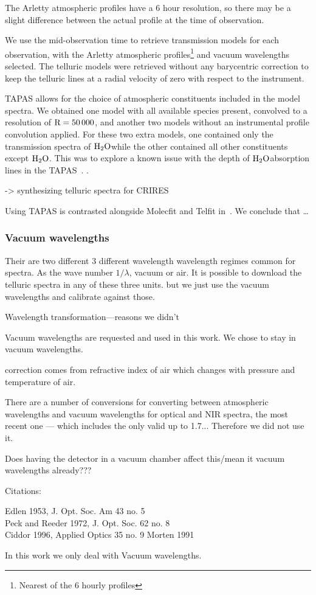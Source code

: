 The Arletty atmospheric profiles have a 6 hour resolution, so there may be a slight difference between the actual profile at the time of observation.

We use the mid-observation time to retrieve transmission models for each observation, with the Arletty atmospheric profiles\footnote{Nearest of the 6 hourly profiles} and vacuum wavelengths selected. The telluric models were retrieved without any barycentric correction to keep the telluric lines at a radial velocity of zero with respect to the instrument.

TAPAS allows for the choice of atmospheric constituents included in the model spectra. We obtained one model with all available species present, convolved to a resolution of \(\rm R=50\,000\), and another two models without an instrumental profile convolution applied. For these two extra models, one contained only the transmission spectra of \(\rm H_{2}O\)while the other contained all other constituents except \(\rm H_{2}O\). This was to explore a known issue with the depth of \(\rm H_{2}O\)absorption lines in the TAPAS~\citet{bertaux_tapas_2014}. .


 -> synthesizing telluric spectra \nir{} for CRIRES~\cite{seifahrt_synthesising_2010}

Using TAPAS is contrasted alongside Molecfit and Telfit in~\cite{ulmer-moll_telluric_2018}. We conclude that \ldots



\subsubsection{Vacuum wavelengths}

Their are two different 3 different wavelength wavelength regimes common for spectra. As the wave number $1/\lambda$, vacuum or air. It is possible to download the telluric spectra in any of these three units. but we just use the vacuum wavelengths and calibrate against those.

Wavelength transformation---reasons we didn't

Vacuum wavelengths are requested and used in this work.
We chose to stay in vacuum wavelengths.

correction comes from refractive index of air which changes with pressure and temperature of air.

There are a number of conversions for converting between atmospheric wavelengths and vacuum wavelengths for optical and NIR spectra, the most recent one --- which includes the \nir{} only valid up to 1.7\um{}...
Therefore we did not use it. 

Does having the detector in a vacuum chamber affect this/mean it vacuum wavelengths already???

Citations:

Edlen 1953, J. Opt. Soc. Am 43 no. 5\\
Peck and Reeder 1972, J. Opt. Soc. 62 no. 8\\
Ciddor 1996, Applied Optics 35 no. 9
Morten 1991

In this work we only deal with Vacuum wavelengths.
